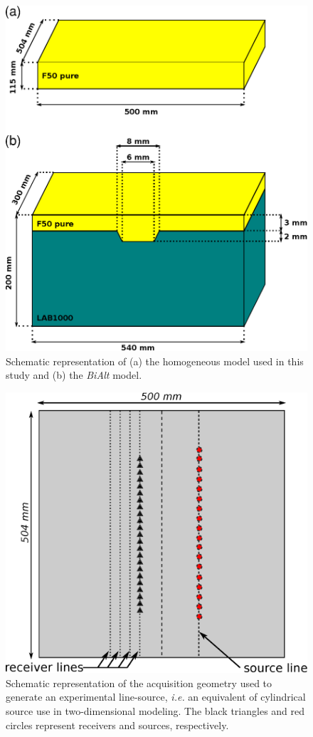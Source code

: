 \documentclass[extra,mreferee]{gji}
\newcommand{\bialt}{\textit{BiAlt} }
\begin{document}
\begin{figure}
\centering
\includegraphics[width=0.50\columnwidth]{Fig/Fig03.eps}
\caption{Schematic representation of (a) the homogeneous model used in this study and (b) the \bialt model.}
\label{Fig:Fig03}
\end{figure}

\clearpage
\newpage


\clearpage
\newpage

\begin{figure}
\centering
\includegraphics[width=0.50\columnwidth]{Fig/Fig05.eps}
\caption{Schematic representation of the acquisition geometry used to generate an experimental line-source, \textit{i.e.} an equivalent of cylindrical source use in two-dimensional modeling. The black triangles and red circles represent receivers and sources, respectively.}
\label{Fig:Fig05}
\end{figure}
\end{document}
